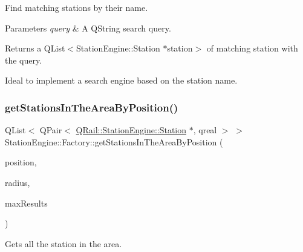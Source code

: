 Find matching stations by their name. 


\begin{DoxyParams}{Parameters}
{\em query} & A Q\+String search query. \\
\hline
\end{DoxyParams}
\begin{DoxyReturn}{Returns}
a Q\+List$<$\+Station\+Engine\+::\+Station $\ast$station$>$ of matching station with the query.
\end{DoxyReturn}
Ideal to implement a search engine based on the station name. \mbox{\label{classQRail_1_1StationEngine_1_1Factory_aa01df9c015321d15605192969d7d363e}} 
\subsubsection{\texorpdfstring{getStationsInTheAreaByPosition()}{getStationsInTheAreaByPosition()}}
{\footnotesize\ttfamily Q\+List$<$ Q\+Pair$<$ \mbox{\hyperlink{classQRail_1_1StationEngine_1_1Station}{Q\+Rail\+::\+Station\+Engine\+::\+Station}} $\ast$, qreal $>$ $>$ Station\+Engine\+::\+Factory\+::get\+Stations\+In\+The\+Area\+By\+Position (\begin{DoxyParamCaption}\item[{const Q\+Geo\+Coordinate \&}]{position,  }\item[{const qreal \&}]{radius,  }\item[{const quint32 \&}]{max\+Results }\end{DoxyParamCaption})}



Gets all the station in the area. 


